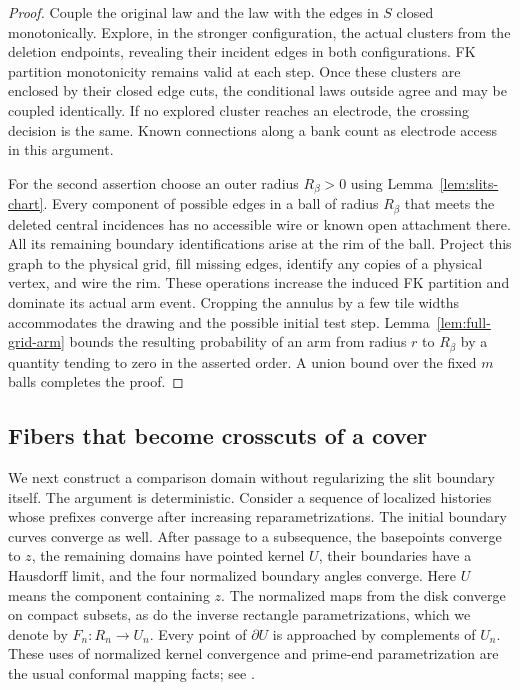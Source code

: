 \begin{proof}
Couple the original law and the law with the edges in $S$ closed
monotonically.  Explore, in the stronger configuration, the actual
clusters from the deletion endpoints, revealing their incident edges
in both configurations.  FK partition monotonicity remains valid at
each step.  Once these clusters are enclosed by their closed edge
cuts, the conditional laws outside agree and may be coupled
identically.  If no explored cluster reaches an electrode, the
crossing decision is the same.  Known connections along a bank count
as electrode access in this argument.

For the second assertion choose an outer radius $R_\beta>0$ using
Lemma~\ref{lem:slits-chart}.  Every component of possible edges in
a ball of radius $R_\beta$ that meets the deleted central incidences
has no accessible wire or known open attachment there.  All its
remaining boundary identifications arise at the rim of the ball.
Project this graph to the physical grid, fill missing edges, identify
any copies of a physical vertex, and wire the rim.  These operations
increase the induced FK partition and dominate its actual arm event.
Cropping the annulus by a few tile widths accommodates the drawing
and the possible initial test step.  Lemma~\ref{lem:full-grid-arm}
bounds the resulting probability of an arm from radius $r$ to
$R_\beta$ by a quantity tending to zero in the asserted order.  A
union bound over the fixed $m$ balls completes the proof.
\end{proof}

\subsection{Fibers that become crosscuts of a cover}

We next construct a comparison domain without regularizing the slit
boundary itself.  The argument is deterministic.  Consider a sequence
of localized histories whose prefixes converge after increasing
reparametrizations.  The initial boundary curves converge as well.
After passage to a subsequence, the basepoints converge to $z$, the
remaining domains have pointed kernel $U$, their boundaries have a
Hausdorff limit, and the four normalized boundary angles converge.
Here $U$ means the component containing $z$.  The normalized maps
from the disk converge on compact subsets, as do the inverse
rectangle parametrizations, which we denote by
$F_n:R_n\to U_n$.  Every point of $\partial U$ is approached by
complements of $U_n$.  These uses of normalized kernel convergence
and prime-end parametrization are the usual conformal mapping facts; see
\cite{Pommerenke}.

